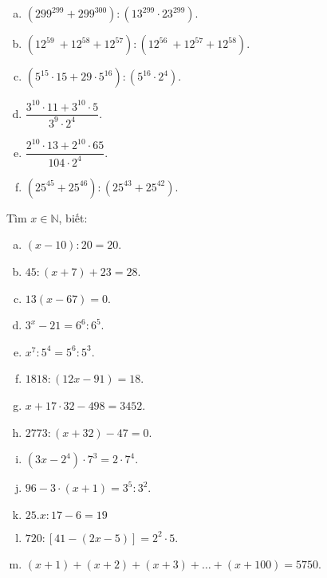 \begin{bt}
\begin{enumerate}[a)]
\item $\left( {{299}^{299}}+{{299}^{300}} \right):\left( {{13}^{299}}\cdot {{23}^{299}} \right)$.
\item $\left( {{12}^{59}}~+{{12}^{58}}+{{12}^{57}} \right):\left( {{12}^{56}}~+{{12}^{57}}+{{12}^{58}} \right)$.

\item $\left( {{5}^{15}}\cdot 15+29\cdot {{5}^{16}} \right):\left( {{5}^{16}}\cdot {{2}^{4}} \right)$.
\item $\dfrac{{{3}^{10}}\cdot 11+{{3}^{10}}\cdot 5}{{{3}^{9}}\cdot {{2}^{4}}}$.
\item $\dfrac{{{2}^{10}}\cdot 13+{{2}^{10}}\cdot 65}{104\cdot {{2}^{4}}}$. 
\item $\left( {{25}^{45}}+{{25}^{46}} \right):\left( {{25}^{43}}+{{25}^{42}} \right)$.
\end{enumerate}
\end{bt}   \begin{bt}
Tìm $x \in \mathbb{N}$, biết:
\begin{enumerate}[a)]
\item $\left( x-10 \right):20=20$. 
\item $45:\left( x+7 \right)+23=28$. 
\item $13\left( x-67 \right)=0$.
\item ${{3}^{x}}-21={{6}^{6}}:{{6}^{5}}$.
\item ${{x}^{7}}:{{5}^{4}}={{5}^{6}}:{{5}^{3}}$. 	
\item $1818:\left( 12x-91 \right)=18$.
\item $x+17\cdot 32-498=3452$.
\item $2773:\left( x+32 \right)-47=0$. 	
\item $(3x-{{2}^{4}})\cdot {{7}^{3}}=2\cdot {{7}^{4}}$. 
\item  $96-3\cdot \left( x+1 \right)={{3}^{5}}:{{3}^{2}}$.
\item $25.x:17 -6 =19$
\item $720:\left[ 41-\left( 2x-5 \right) \right]={{2}^{2}}\cdot 5$.
\item $\left( x+1 \right)+\left( x+2 \right)+\left( x+3 \right)+\ldots +\left( x+100 \right)=5750$.
\end{enumerate}
\end{bt} 